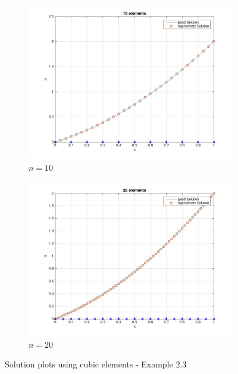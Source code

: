 \begin{example}
	\begin{figure}[h!]
			\begin{subfigure}{0.5\textwidth}
				\includegraphics[scale = 0.2]{images/ex3/cubic10.jpg}
				\caption{$n = 10$}	
			\end{subfigure}
			\begin{subfigure}{0.5\textwidth}
				\includegraphics[scale = 0.2]{images/ex3/cubic.jpg}
				\caption{$n = 20$}	
			\end{subfigure}
			\caption{Solution plots using cubic elements - Example 2.3}
			\label{fig5}		
	\end{figure}
\end{example}

